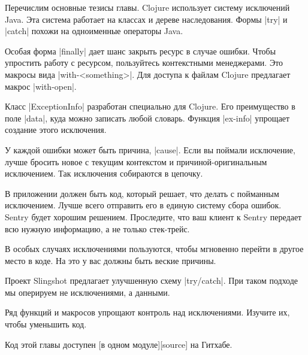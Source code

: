 Перечислим основные тезисы главы. Clojure использует систему исключений
Java. Эта система работает на классах и дереве наследования. Формы \spverb|try| и
\spverb|catch| похожи на одноименные операторы Java.

Особая форма \spverb|finally| дает шанс закрыть ресурс в случае ошибки. Чтобы упростить
работу с ресурсом, пользуйтесь контекстными менеджерами. Это макросы вида
\spverb|with-<something>|. Для доступа к файлам Clojure предлагает макрос \spverb|with-open|.

Класс \spverb|ExceptionInfo| разработан специально для Clojure. Его преимущество в поле
\spverb|data|, куда можно записать любой словарь. Функция \spverb|ex-info| упрощает создание
этого исключения.

У каждой ошибки может быть причина, \spverb|cause|. Если вы поймали исключение, лучше
бросить новое с текущим контекстом и причиной-оригинальным исключением. Так
исключения собираются в цепочку.

В приложении должен быть код, который решает, что делать с пойманным
исключением. Лучше всего отправить его в единую систему сбора ошибок. Sentry
будет хорошим решением. Проследите, что ваш клиент к Sentry передает всю нужную
информацию, а не только стек-трейс.

В особых случаях исключениями пользуются, чтобы мгновенно перейти в другое место
в коде. На это у вас должны быть веские причины.

Проект Slingshot предлагает улучшенную схему \spverb|try/catch|. При таком подходе мы
оперируем не исключениями, а данными.

Ряд функций и макросов упрощают контроль над исключениями. Изучите их, чтобы
уменьшить код.


Код этой главы доступен [в одном модуле][source] на Гитхабе.
